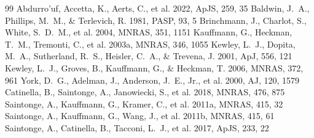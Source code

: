 \documentclass[twocolumn]{aastex631}
\begin{document}
\begin{thebibliography}{99}
 Abdurro'uf, Accetta, K., Aerts, C., et al. 2022, ApJS, 259, 35
 Baldwin, J.~A., Phillips, M.~M., \& Terlevich, R. 1981, PASP, 93, 5
 Brinchmann, J., Charlot, S., White, S.~D.~M., et al. 2004, MNRAS, 351, 1151
 Kauffmann, G., Heckman, T.~M., Tremonti, C., et al. 2003a, MNRAS, 346, 1055
 Kewley, L.~J., Dopita, M.~A., Sutherland, R.~S., Heisler, C.~A., \& Trevena, J. 2001, ApJ, 556, 121
 Kewley, L.~J., Groves, B., Kauffmann, G., \& Heckman, T. 2006, MNRAS, 372, 961
 York, D.~G., Adelman, J., Anderson, J.~E., Jr., et al. 2000, AJ, 120, 1579
 Catinella, B., Saintonge, A., Janowiecki, S., et al. 2018, MNRAS, 476, 875
 Saintonge, A., Kauffmann, G., Kramer, C., et al. 2011a, MNRAS, 415, 32
 Saintonge, A., Kauffmann, G., Wang, J., et al. 2011b, MNRAS, 415, 61
 Saintonge, A., Catinella, B., Tacconi, L.~J., et al. 2017, ApJS, 233, 22
\end{thebibliography}
\end{document}
